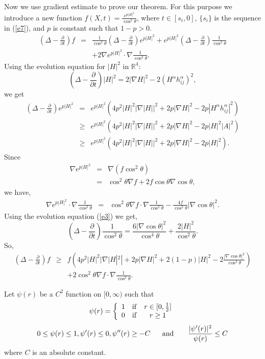 Now we use gradient estimate to prove our theorem. For this
purpose we introduce a new function $f(X,
t)=\frac{e^{p|H|^2}}{\cos^2\theta}$, where $t\in [s_i, 0]$,
$\{s_i\}$ is the sequence in (\ref{e7}), and $p$ is constant such
that $1-p>0$. \allowdisplaybreaks
\begin{eqnarray*}\label{e4}
(\Delta-\frac{\partial}{\partial
t})f&=&\frac{1}{\cos^2\theta}(\Delta-\frac{\partial}{\partial
t})e^{p|H|^2}+e^{p|H|^2}(\Delta-\frac{\partial }{\partial
t})\frac{1}{\cos^2\theta}\nonumber\\&&+2\nabla
e^{p|H|^2}\cdot\nabla\frac{1}{\cos^2\theta}.
\end{eqnarray*} Using the evolution equation for $|H|^2$ in
${\mathbb{R}}^4$:
$$(\Delta-\frac{\partial}{\partial t}) |H|^2=2|\nabla H|^2-2(H^\alpha
h^\alpha_{ij})^2, $$ we get
\begin{eqnarray*}
(\Delta-\frac{\partial}{\partial t}) e^{p |H|^2}
&=&e^{p|H|^2}(4p^2|H|^2|\nabla |H||^2+2p|\nabla H|^2-2p|H^\alpha
h^\alpha_{ij}|^2)\\ &\geq& e^{p|H|^2}(4p^2|H|^2|\nabla
|H||^2+2p|\nabla H|^2-2p|H|^2|A|^2)\\ &\geq&
e^{p|H|^2}(4p^2|H|^2|\nabla |H||^2+2p|\nabla H|^2-2p|H|^2).
\end{eqnarray*} Since
\begin{eqnarray*}
\nabla e^{p |H|^2}  &=&\nabla (f\cos^2\theta) \\ &=&
\cos^2\theta\nabla f+2f\cos\theta\nabla\cos\theta,
\end{eqnarray*} we have,
\begin{eqnarray*}
\nabla e^{p |H|^2}\cdot\nabla\frac{1}{\cos^2\theta}
&=&\cos^2\theta\nabla
f\cdot\nabla\frac{1}{\cos^2\theta}-\frac{4f}{\cos^2\theta}|\nabla\cos\theta|^2.
\end{eqnarray*} Using the evolution equation (\ref{e3}) we get,
$$(\Delta-\frac{\partial}{\partial t})\frac{1}{\cos^2\theta}=\frac{6|\nabla\cos\theta|^2}
{\cos^4\theta}+\frac{2|H|^2}{\cos^2\theta}.
$$ So,
\begin{eqnarray}\label{e10}
(\Delta-\frac{\partial}{\partial t})f &\geq& f(4p^2|H|^2|\nabla
|H|^2|+2p|\nabla
H|^2+2(1-p)|H|^2-2\frac{|\nabla\cos\theta|^2}{\cos^2\theta})
\nonumber\\ &&+2\cos^2\theta\nabla
f\cdot\nabla\frac{1}{\cos^2\theta}.
\end{eqnarray}

Let $\psi(r)$ be a $C^2$ function on $[0, \infty)$ such that
\begin{eqnarray*}
\psi(r)=\left\{\begin{array}{clcr}  1 &{\rm if} & r\in [0, \frac{1}{2}]\\
0 &{\rm if}  & r\geq 1
\end{array}\right.
\end{eqnarray*}
$$ 0\leq\psi(r)\leq 1, \psi'(r)\leq 0, \psi''(r)\geq -C ~~~~~{\rm and
}~~~~~~ \frac{|\psi'(r)|^2}{\psi(r)}\leq C
$$ where $C$ is an absolute constant.


